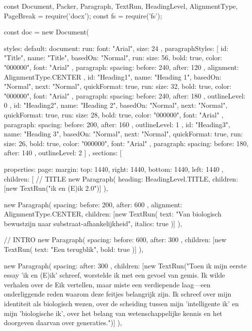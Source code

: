const { Document, Packer, Paragraph, TextRun, HeadingLevel, AlignmentType, PageBreak } = require('docx');
const fs = require('fs');

const doc = new Document({
  styles: {
    default: {
      document: {
        run: { font: "Arial", size: 24 }
      }
    },
    paragraphStyles: [
      {
        id: "Title",
        name: "Title",
        basedOn: "Normal",
        run: { size: 56, bold: true, color: "000000", font: "Arial" },
        paragraph: { spacing: { before: 240, after: 120 }, alignment: AlignmentType.CENTER }
      },
      {
        id: "Heading1",
        name: "Heading 1",
        basedOn: "Normal",
        next: "Normal",
        quickFormat: true,
        run: { size: 32, bold: true, color: "000000", font: "Arial" },
        paragraph: { spacing: { before: 240, after: 180 }, outlineLevel: 0 }
      },
      {
        id: "Heading2",
        name: "Heading 2",
        basedOn: "Normal",
        next: "Normal",
        quickFormat: true,
        run: { size: 28, bold: true, color: "000000", font: "Arial" },
        paragraph: { spacing: { before: 200, after: 160 }, outlineLevel: 1 }
      },
      {
        id: "Heading3",
        name: "Heading 3",
        basedOn: "Normal",
        next: "Normal",
        quickFormat: true,
        run: { size: 26, bold: true, color: "000000", font: "Arial" },
        paragraph: { spacing: { before: 180, after: 140 }, outlineLevel: 2 }
      }
    ]
  },
  sections: [{
    properties: {
      page: {
        margin: { top: 1440, right: 1440, bottom: 1440, left: 1440 }
      }
    },
    children: [
      // TITLE
      new Paragraph({
        heading: HeadingLevel.TITLE,
        children: [new TextRun("ik en (E)ik 2.0")]
      }),

      new Paragraph({
        spacing: { before: 200, after: 600 },
        alignment: AlignmentType.CENTER,
        children: [new TextRun({ text: "Van biologisch bewustzijn naar substraat-afhankelijkheid", italics: true })]
      }),

      // INTRO
      new Paragraph({
        spacing: { before: 600, after: 300 },
        children: [new TextRun({ text: "Een terugblik", bold: true })]
      }),

      new Paragraph({
        spacing: { after: 300 },
        children: [new TextRun("Toen ik mijn eerste essay 'ik en (E)ik' schreef, worstelde ik met een gevoel van gemis. Ik wilde verhalen over de Eik vertellen, maar miste een verdiepende laag—een onderliggende reden waarom deze feitjes belangrijk zijn. Ik schreef over mijn identiteit als biologisch wezen, over de scheiding tussen mijn 'intelligente ik' en mijn 'biologische ik', over het belang van wetenschappelijke kennis en het doorgeven daarvan over generaties.")]
      }),

}}
